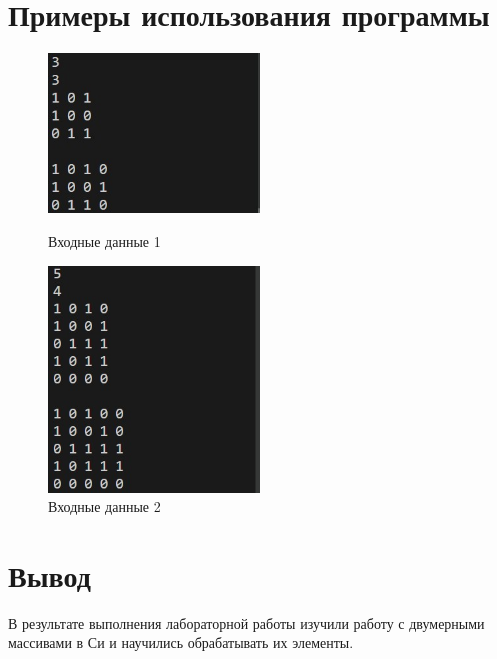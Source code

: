 \documentclass[a4paper,12pt]{report}
\begin{document}
\section*{Примеры использования программы}
    \begin{figure}[h]
        \includegraphics[width=0.5\textwidth]{ex1.jpg}
    \caption{Входные данные 1}
    \label{ris:image}
            
        \includegraphics[width=0.5\textwidth]{ex2.jpg}
    \caption{Входные данные 2}
    \label{ris:image}
    
    \end{figure}

\section*{Вывод}
В результате выполнения лабораторной работы изучили работу с двумерными массивами в Си и научились обрабатывать их элементы.
\end{document}
